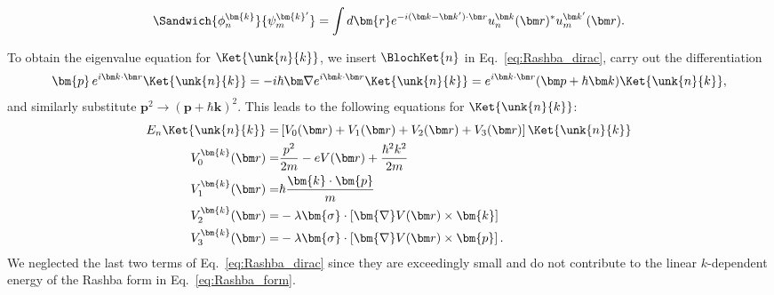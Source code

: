 \begin{equation}
	\Sandwich{\phi_n^{\bm{k}}}{\psi_m^{\bm{k}'}} = \int d\bm{r} e^{-i (\bm k - \bm k') \cdot \bm r} u_n^{\bm k }(\bm r)^* u_m^{\bm k'}(\bm r).
\end{equation}

To obtain the eigenvalue equation for $\Ket{\unk{n}{k}}$, we insert $\BlochKet{n}$ in Eq.~\eqref{eq:Rashba_dirac}, carry out the differentiation
\begin{equation}
	\label{eq:Rashba_momentum}
\bm{p} \, \Eikr\Ket{\unk{n}{k}} = -i \hbar \bm \nabla \Eikr\Ket{\unk{n}{k}} = \Eikr(\bm p + \hbar \bm k)\Ket{\unk{n}{k}},
\end{equation}
and similarly substitute $\bm{p}^2 \rightarrow (\bm{p}+\hbar \bm{k})^2$.
This leads to the following equations for $\Ket{\unk{n}{k}}$:
\begin{align}
	\label{eq:Rashba_unk_Vs}
	E_n \Ket{\unk{n}{k}} =& \left[V_0(\bm r) + V_1(\bm r)  +  V_2(\bm r) + V_3(\bm r) \right] \Ket{\unk{n}{k}} \\
	V_0^{\bm{k}}(\bm r) =& \frac{p^2}{2m} - eV(\bm r) + \frac{\hbar^2 k^2}{2m} \\
	V_1^{\bm{k}}(\bm r) =& \hbar\frac{\bm{k}\cdot\bm{p}}{m} \\
	V_2^{\bm{k}}(\bm r) =& -\lambda \bm{\sigma} \cdot \left[ \bm{\nabla}V(\bm r) \times \bm{k}\right] \\
	V_3^{\bm{k}}(\bm r) =& -\lambda \bm{\sigma} \cdot \left[ \bm{\nabla}V(\bm r) \times \bm{p}\right].
\end{align}
We neglected the last two terms of Eq.~\eqref{eq:Rashba_dirac} since they are exceedingly small and do not contribute to the linear $k$-dependent energy of the Rashba form in Eq.~\eqref{eq:Rashba_form}.

